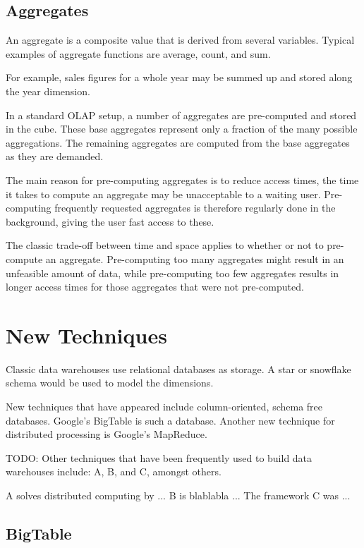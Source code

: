 \subsection*{Aggregates}

An aggregate is a composite value that is derived from several variables.
Typical examples of aggregate functions are average, count, and sum.

For example, sales figures for a whole year may be summed up and stored along
the year dimension.

In a standard OLAP setup, a number of aggregates are pre-computed and
stored in the cube. These base aggregates represent only a fraction of the
many possible aggregations. The remaining aggregates are computed from the
base aggregates as they are demanded.

The main reason for pre-computing aggregates is to reduce access times, the
time it takes to compute an aggregate may be unacceptable to a waiting
user. Pre-computing frequently requested aggregates is therefore regularly
done in the background, giving the user fast access to these.
\cite{olap_solutions}

The classic trade-off between time and space applies to whether or not to
pre-compute an aggregate. Pre-computing too many aggregates might result in an
unfeasible amount of data, while pre-computing too few aggregates results in
longer access times for those aggregates that were not pre-computed.


\section{New Techniques}

Classic data warehouses use relational databases as storage. A star or snowflake
schema would be used to model the dimensions.

New techniques that have appeared include column-oriented, schema free
databases. Google's BigTable is such a database. Another new technique for
distributed processing is Google's MapReduce.

TODO:
Other techniques that have been frequently used to build data warehouses
include: A, B, and C, amongst others.

A solves distributed computing by ...
B is blablabla ...
The framework C was ...


\subsection{BigTable}

